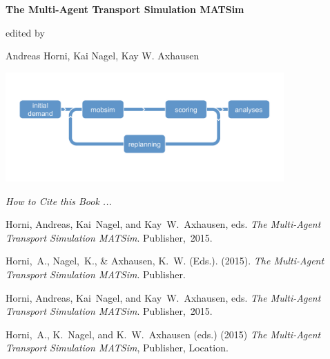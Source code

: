 \thispagestyle{plainstyle}
\begin{center}
      \bigskip
      
      \bigskip

      \bigskip
      
		
      {\textbf{\Large{The Multi-Agent Transport Simulation MATSim}}}

      \bigskip

      \bigskip
      
      \bigskip

      edited by

      Andreas Horni, Kai Nagel, Kay W. Axhausen

      \bigskip

      \bigskip
      
      \bigskip
      
      \includegraphics[width=0.8\textwidth]{figures/matsimcycle}
			
    \end{center}
		
		
			\vskip 10cm

\emph{How to Cite this Book ...}
{\scriptsize
\begin{description}\styleDescription
\item[\imp{MLA:}] Horni, Andreas, Kai~Nagel, and Kay~W.~Axhausen, eds. \emph{The Multi-Agent Transport Simulation MATSim}. Publisher,~2015.
%
\item[\imp{APA:}] Horni,~A., Nagel,~K., \& Axhausen, K.~W. (Eds.). (2015). \emph{The Multi-Agent Transport Simulation MATSim}. Publisher.
%
\item[\imp{Chicago:}] Horni, Andreas, Kai~Nagel, and Kay~W.~Axhausen, eds. \emph{The Multi-Agent Transport Simulation MATSim}. Publisher,~2015.
%
\item[IVT house style:] Horni,~A., K.~Nagel, and K.~W.~Axhausen (eds.) (2015) \emph{The Multi-Agent Transport Simulation MATSim}, Publisher, Location.
%
\end{description}
}

